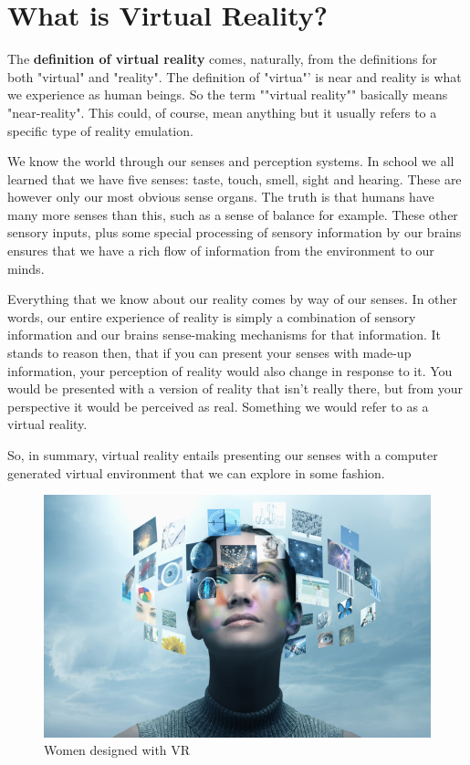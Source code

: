 \section{What is Virtual Reality?}
The \textbf{definition of virtual reality} comes, naturally, from the definitions for both "virtual" and "reality". The definition of "virtua"’ is near and reality is what we experience as human beings. So the term ""virtual reality"" basically means "near-reality". This could, of course, mean anything but it usually refers to a specific type of reality emulation.

We know the world through our senses and perception systems. In school we all learned that we have five senses: taste, touch, smell, sight and hearing. These are however only our most obvious sense organs. The truth is that humans have many more senses than this, such as a sense of balance for example. These other sensory inputs, plus some special processing of sensory information by our brains ensures that we have a rich flow of information from the environment to our minds.

Everything that we know about our reality comes by way of our senses. In other words, our entire experience of reality is simply a combination of sensory information and our brains sense-making mechanisms for that information. It stands to reason then, that if you can present your senses with made-up information, your perception of reality would also change in response to it. You would be presented with a version of reality that isn’t really there, but from your perspective it would be perceived as real. Something we would refer to as a virtual reality.

So, in summary, virtual reality entails presenting our senses with a computer generated virtual environment that we can explore in some fashion.

\begin{figure}[!h]
	\begin{center}
		\includegraphics[width=1\linewidth]{images/vr_women}
		\caption{Women designed with VR}
	\end{center}
\end{figure}


